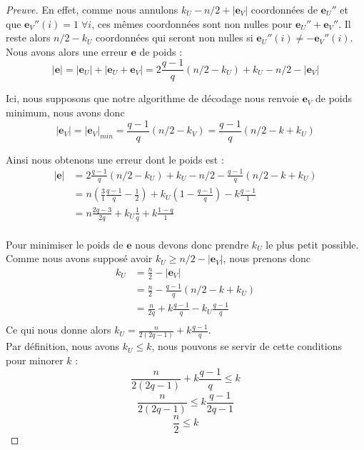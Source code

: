\documentclass[12pt]{article}
\theoremstyle{plain}
\theoremstyle{definition}
\newcommand{\e}{\mathbf{e}}
\begin{document}
\begin{proof}[Preuve]
En effet, comme nous annulons $k_U - n/2 + |\e_V|$ coordonnées de $\e_U''$ et que $\e_V''(i) = 1 \; \forall i$, ces mêmes coordonnées sont non nulles pour $\e_U'' + \e_V''$. Il reste alors $n/2 -k_U$ coordonnées qui seront non nulles si $\e_U''(i) \neq -\e_V''(i)$. \\
Nous avons alors une erreur $\e$ de poids :
$$ |\e| =  |\e_U| + |\e_U + \e_V| = 2\frac{q-1}{q}(n/2-k_U) + k_U - n/2 - |\e_V|$$

\noindent Ici, nous supposons que notre algorithme de décodage nous renvoie $\e_V$ de poids minimum, nous avons donc $$|\e_V| = |\e_V|_{min} = \frac{q-1}{q}(n/2-k_V) = \frac{q-1}{q}(n/2-k+k_U)$$

\noindent Ainsi nous obtenons une erreur dont le poids est :
\begin{equation*}
\begin{split}
|\e| &= 2\frac{q-1}{q}(n/2-k_U) + k_U - n/2 - \frac{q-1}{q}(n/2-k+k_U)\\
 &= n\left(  \frac{3}{1}\frac{q-1}{q}-\frac{1}{2}\right) + k_U \left(1 - \frac{q-1}{q} \right) - k \frac{q-1}{1}\\
  &= n\frac{2q-3}{2q} + k_U\frac{1}{q}+ k \frac{1-q}{1}\\
\end{split}
\end{equation*}

Pour minimiser le poids de $\e$ nous devons donc prendre $k_U$ le plus petit possible. Comme nous avons supposé avoir $k_U \geq n/2 - |\e_V|$, nous prenons donc 
\begin{equation*}
\begin{split}
k_U &= \frac{n}{2} - |\e_V|\\
&= \frac{n}{2} - \frac{q-1}{q}(n/2-k+k_U)\\
&= \frac{n}{2q} + k\frac{q-1}{q} -k_U\frac{q-1}{q}\\
\end{split}
\end{equation*}
Ce qui nous donne alors $k_U = \frac{n}{2(2q-1)} + k\frac{q-1}{q}$.\\

Par définition, nous avons $k_U \leq k$, nous pouvons se servir de cette conditions pour minorer $k$ :
$$\frac{n}{2(2q-1)} + k\frac{q-1}{q} \leq k$$
$$\frac{n}{2(2q-1)} \leq k\frac{q-1}{2q-1}$$
$$\frac{n}{2} \leq k$$


\end{proof}
\end{document}
